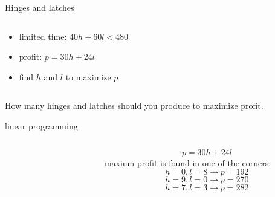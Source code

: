 \begin{frame}{Hinges and latches}
\begin{columns}
\begin{column}{0.5\linewidth}
\begin{itemize}
\pause\item limited time: $40h + 60l < 480$

\pause \item profit: $p = 30h + 24l$

\pause \item find $h$ and $l$ to maximize $p$
  \end{itemize}
 \end{column}
\end{columns}
\pause \vspace{20pt}

How many hinges and latches should you produce to maximize profit.

\end{frame}


\begin{frame}{linear programming}

\begin{columns}
 \begin{column}{0.5\linewidth}
\begin{figure}
\end{figure}
 \end{column}
 \begin{column}{0.5\linewidth}
  $$ p = 30h + 24l$$
  \pause
  maxium profit is found in one of the corners: \pause
  $$ h = 0, l = 8 \rightarrow  p = 192$$ \pause
  $$ h = 9, l = 0  \rightarrow  p = 270$$  \pause
  $$ h = 7, l = 3 \rightarrow p =  282$$ \pause
 \end{column}
 \end{columns}
\end{frame}

